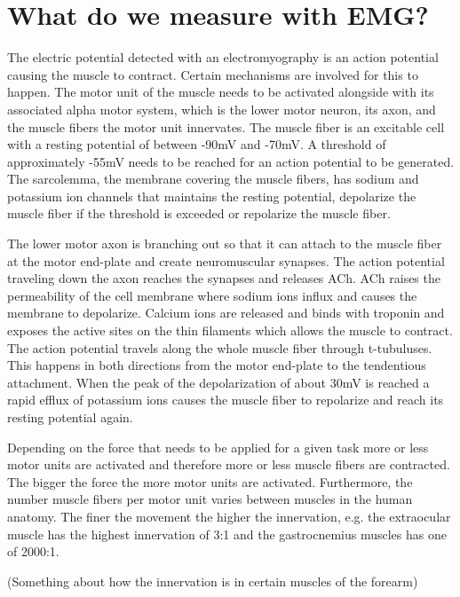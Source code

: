 \section{What do we measure with EMG?}

The electric potential detected with an electromyography is an action potential causing the muscle to contract. Certain mechanisms are involved for this to happen. The motor unit of the muscle needs to be activated alongside with its associated alpha motor system, which is the lower motor neuron, its axon, and the muscle fibers the motor unit innervates. The muscle fiber is an excitable cell with a resting potential of between -90mV and -70mV. A threshold of approximately -55mV needs to be reached for an action potential to be generated. The sarcolemma, the membrane covering the muscle fibers, has sodium and potassium ion channels that maintains the resting potential, depolarize the muscle fiber if the threshold is exceeded or repolarize the muscle fiber.

The lower motor axon is branching out so that it can attach to the muscle fiber at the motor end-plate and create neuromuscular synapses. The action potential traveling down the axon reaches the synapses and releases ACh. ACh raises the permeability of the cell membrane where sodium ions influx and causes the membrane to depolarize. Calcium ions are released and binds with troponin and exposes the active sites on the thin filaments which allows the muscle to contract. The action potential travels along the whole muscle fiber through t-tubuluses. This happens in both directions from the motor end-plate to the tendentious attachment. When the peak of the depolarization of about 30mV is reached a rapid efflux of potassium ions causes the muscle fiber to repolarize and reach its resting potential again.

Depending on the force that needs to be applied for a given task more or less motor units are activated and therefore more or less muscle fibers are contracted. The bigger the force the more motor units are activated. Furthermore, the number muscle fibers per motor unit varies between muscles in the human anatomy. The finer the movement the higher the innervation, e.g. the extraocular muscle has the highest innervation of 3:1 and the gastrocnemius muscles has one of 2000:1.

(Something about how the innervation is in certain muscles of the forearm)